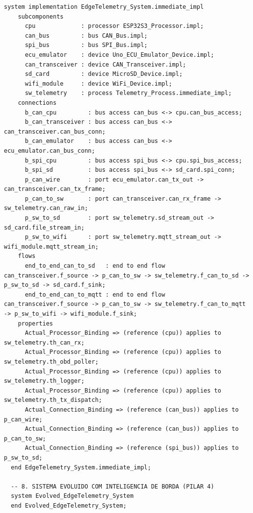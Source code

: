 \begin{lstlisting}[language=AADL, caption={Modelo textual AADL completo consolidado (\texttt{EdgeTelemetryLayer.aadl}).}]
  system implementation EdgeTelemetry_System.immediate_impl
    subcomponents
      cpu             : processor ESP32S3_Processor.impl;
      can_bus         : bus CAN_Bus.impl;
      spi_bus         : bus SPI_Bus.impl;
      ecu_emulator    : device Uno_ECU_Emulator_Device.impl;
      can_transceiver : device CAN_Transceiver.impl;
      sd_card         : device MicroSD_Device.impl;
      wifi_module     : device WiFi_Device.impl;
      sw_telemetry    : process Telemetry_Process.immediate_impl;
    connections
      b_can_cpu         : bus access can_bus <-> cpu.can_bus_access;
      b_can_transceiver : bus access can_bus <-> can_transceiver.can_bus_conn;
      b_can_emulator    : bus access can_bus <-> ecu_emulator.can_bus_conn;
      b_spi_cpu         : bus access spi_bus <-> cpu.spi_bus_access;
      b_spi_sd          : bus access spi_bus <-> sd_card.spi_conn;
      p_can_wire        : port ecu_emulator.can_tx_out -> can_transceiver.can_tx_frame;
      p_can_to_sw       : port can_transceiver.can_rx_frame -> sw_telemetry.can_raw_in;
      p_sw_to_sd        : port sw_telemetry.sd_stream_out -> sd_card.file_stream_in;
      p_sw_to_wifi      : port sw_telemetry.mqtt_stream_out -> wifi_module.mqtt_stream_in;
    flows
      end_to_end_can_to_sd   : end to end flow can_transceiver.f_source -> p_can_to_sw -> sw_telemetry.f_can_to_sd -> p_sw_to_sd -> sd_card.f_sink;
      end_to_end_can_to_mqtt : end to end flow can_transceiver.f_source -> p_can_to_sw -> sw_telemetry.f_can_to_mqtt -> p_sw_to_wifi -> wifi_module.f_sink;
    properties
      Actual_Processor_Binding => (reference (cpu)) applies to sw_telemetry.th_can_rx;
      Actual_Processor_Binding => (reference (cpu)) applies to sw_telemetry.th_obd_poller;
      Actual_Processor_Binding => (reference (cpu)) applies to sw_telemetry.th_logger;
      Actual_Processor_Binding => (reference (cpu)) applies to sw_telemetry.th_tx_dispatch;
      Actual_Connection_Binding => (reference (can_bus)) applies to p_can_wire;
      Actual_Connection_Binding => (reference (can_bus)) applies to p_can_to_sw;
      Actual_Connection_Binding => (reference (spi_bus)) applies to p_sw_to_sd;
  end EdgeTelemetry_System.immediate_impl;

  -- 8. SISTEMA EVOLUIDO COM INTELIGENCIA DE BORDA (PILAR 4)
  system Evolved_EdgeTelemetry_System
  end Evolved_EdgeTelemetry_System;


\end{lstlisting}
